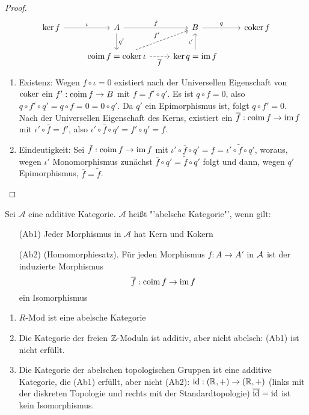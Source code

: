 \begin{proof}
	$$\begin{tikzcd}
	\ker f \arrow{r}{\iota} & A \arrow{d}{q'} \arrow{r}{f} & B \arrow{r}{q} & \coker f \\
	& \coim f = \coker \iota \arrow[dashed]{ur}{f'} \arrow[swap, dashed]{r}{\bar f} &\ker q = \im f \arrow{u}{\iota'}  & 
	\end{tikzcd}
	$$
	\begin{enumerate}
		\item Existenz: Wegen $f\circ \iota = 0$ existiert nach der Universellen Eigenschaft von $\operatorname{coker}$ ein $f': \operatorname{coim} f \to B$ mit $f= f' \circ q'$. Es ist $q \circ  f=0$, also $q \circ f' \circ q' = q \circ f = 0 = 0 \circ q'$. Da $q'$ ein Epimorphismus ist, folgt $q\circ f' = 0$. Nach der Universellen Eigenschaft des Kerns, existiert ein $\overline f: \operatorname{coim} f \to \operatorname{im} f$ mit $\iota' \circ \bar f = f'$, also $\iota' \circ \bar f \circ q' = f' \circ q' = f$.
		\item Eindeutigkeit: Sei $\tilde{f}: \operatorname{coim} f \to \operatorname{im} f$ mit $\iota' \circ \bar f\circ q' = f = \iota' \circ \tilde{f} \circ q'$, woraus, wegen $\iota'$ Monomorphismus zunächst $\bar f \circ q' = \tilde{f} \circ q'$ folgt und dann, wegen $q'$ Epimorphismus, $\bar f = \tilde{f}$.
	\end{enumerate}
\end{proof}
\begin{df}
	Sei $\mathcal{A}$ eine additive Kategorie. $\mathcal{A}$ heißt "'abelsche Kategorie"', wenn gilt:
	\begin{enumerate}
		\item[(Ab1)] Jeder Morphismus in $\mathcal{A}$ hat Kern und Kokern
		\item[(Ab2)] (Homomorphiesatz). Für jeden Morphismus $f:A \to A'$ in $\mathcal{A}$ ist der induzierte Morphismus 
		$$\overline f : \operatorname{coim} f \to \operatorname{im} f$$
		ein Isomorphismus 
	\end{enumerate}
\end{df}
\begin{bsp}
	\begin{enumerate}[label = \alph*)]
		\item $R$-Mod ist eine abelsche Kategorie
		\item Die Kategorie der freien $\mathbb{Z}$-Moduln ist additiv, aber nicht abelsch: (Ab1) ist nicht erfüllt.
		\item Die Kategorie der abelschen topologischen Gruppen ist eine additive Kategorie, die (Ab1) erfüllt, aber nicht (Ab2): $\operatorname{id}: (\mathbb{R}, +) \to (\mathbb{R}, +)$ (links mit der diskreten Topologie und rechts mit der Standardtopologie) $\overline{\operatorname{id}} = \operatorname{id}$ ist kein Isomorphismus.
	\end{enumerate}
\end{bsp}
